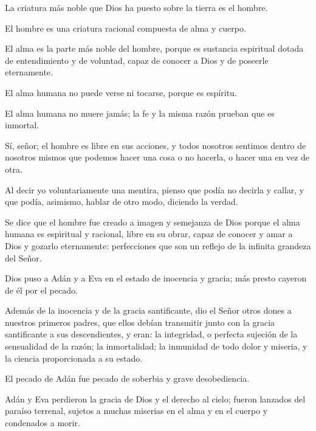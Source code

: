  La
criatura más noble que Dios ha puesto sobre la tierra es el hombre.

 El hombre es una criatura racional compuesta de
alma y cuerpo.

 El alma es la parte más noble del hombre, porque es
sustancia espiritual dotada de entendimiento y de voluntad, capaz de conocer a
Dios y de poseerle eternamente.

 El alma humana no puede
verse ni tocarse, porque es espíritu.

 El alma humana no muere
jamás; la fe y la misma razón prueban que es inmortal.

 Sí, señor; el hombre es libre en sus
acciones, y todos nosotros sentimos dentro de nosotros mismos que podemos
hacer una cosa o no hacerla, o hacer una en vez de otra.

 Al decir yo
voluntariamente una mentira, pienso que podía no decirla y callar, y que podía,
asimismo, hablar de otro modo, diciendo la verdad.

 Se dice que el hombre fue creado a imagen y semejanza de Dios porque
el alma humana es espiritual y racional, libre en su obrar, capaz de conocer y amar
a Dios y gozarlo eternamente: perfecciones que son un reflejo de la infinita
grandeza del Señor.

 Dios puso a Adán y a Eva en el estado de inocencia y gracia; más presto cayeron
de él por el pecado.

 Además de la inocencia y de la gracia
santificante, dio el Señor otros dones a nuestros primeros padres, que ellos debían
transmitir junto con la gracia santificante a sus descendientes, y eran: la integridad, o perfecta sujeción de la sensualidad de la razón; la inmortalidad; la inmunidad de todo dolor y miseria, y la ciencia proporcionada a su estado.

 El pecado de Adán fue pecado de soberbia
y grave desobediencia.

 Adán y Eva perdieron la gracia de
Dios y el derecho al cielo; fueron lanzados del paraíso terrenal, sujetos a muchas
miserias en el alma y en el cuerpo y condenados a morir.

